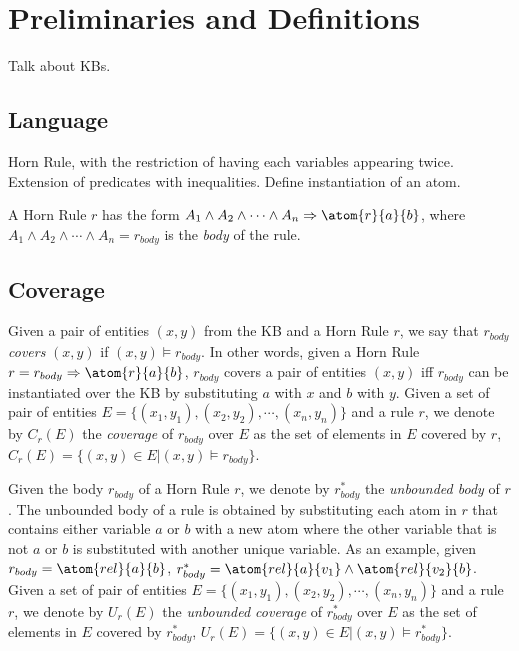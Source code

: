 \section{Preliminaries and Definitions}
{\color{red} Talk about KBs.}

\subsection{Language}
{\color{red} Horn Rule, with the restriction of having each variables appearing twice.
Extension of predicates with inequalities.
Define instantiation of an atom.}

A Horn Rule $r$ has the form $A_1 \wedge A_2 \wedge \cdots \wedge A_n \Rightarrow \atom{r}{a}{b}$, where  $A_1 \wedge A_2 \wedge \cdots \wedge A_n = r_{body}$ is the \emph{body} of the rule.

\subsection{Coverage}
Given a pair of entities $(x,y)$ from the KB and a Horn Rule $r$, we say that $r_{body}$ \emph{covers} $(x,y)$ if
$(x,y) \models r_{body}$. In other words, given a Horn Rule $r = r_{body} \Rightarrow \atom{r}{a}{b}$, $r_{body}$ covers a pair of entities $(x,y)$ iff $r_{body}$ can be instantiated over the KB by substituting $a$ with $x$ and $b$ with $y$. Given a set of pair of entities $E = \{(x_1,y_1),(x_2,y_2),\cdots,(x_n,y_n)\}$ and a rule $r$, we denote by $C_r(E)$ the \emph{coverage} of $r_{body}$ over $E$ as the set of elements in $E$ covered by $r$, $C_r(E)=\{(x,y) \in E | (x,y) \models r_{body}\}$.

Given the body $r_{body}$ of a Horn Rule $r$, we denote by $r^{*}_{body}$ the \emph{unbounded body} of $r$. The unbounded body of a rule is obtained by substituting each atom in $r$ that contains either variable $a$ or $b$ with a new atom where the other variable that is not $a$ or $b$ 
is substituted with another unique variable. As an example, given $r_{body} = \atom{rel}{a}{b}$, $r^{*}_{body} = \atom{rel}{a}{v_1} \wedge \atom{rel}{v_2}{b}$.
Given a set of pair of entities $E = \{(x_1,y_1),(x_2,y_2),\cdots,(x_n,y_n)\}$ and a rule $r$, we denote by $U_r(E)$ the \emph{unbounded coverage} of $r^{*}_{body}$ over $E$ as the set of elements in $E$ covered by $r^{*}_{body}$, $U_r(E)=\{(x,y) \in E | (x,y) \models r^{*}_{body}\}$.

